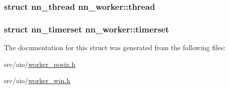 \subsubsection[{thread}]{\setlength{\rightskip}{0pt plus 5cm}struct {\bf nn\+\_\+thread} nn\+\_\+worker\+::thread}\hypertarget{structnn__worker_a3c0975d10f04acfecca6058b515be8bd}{}\label{structnn__worker_a3c0975d10f04acfecca6058b515be8bd}
\subsubsection[{timerset}]{\setlength{\rightskip}{0pt plus 5cm}struct {\bf nn\+\_\+timerset} nn\+\_\+worker\+::timerset}\hypertarget{structnn__worker_ad1a767bfefc0f42c2e3344d0e7b4dcf2}{}\label{structnn__worker_ad1a767bfefc0f42c2e3344d0e7b4dcf2}


The documentation for this struct was generated from the following files\+:\begin{DoxyCompactItemize}
\item 
src/aio/\hyperlink{worker__posix_8h}{worker\+\_\+posix.\+h}\item 
src/aio/\hyperlink{worker__win_8h}{worker\+\_\+win.\+h}\end{DoxyCompactItemize}
